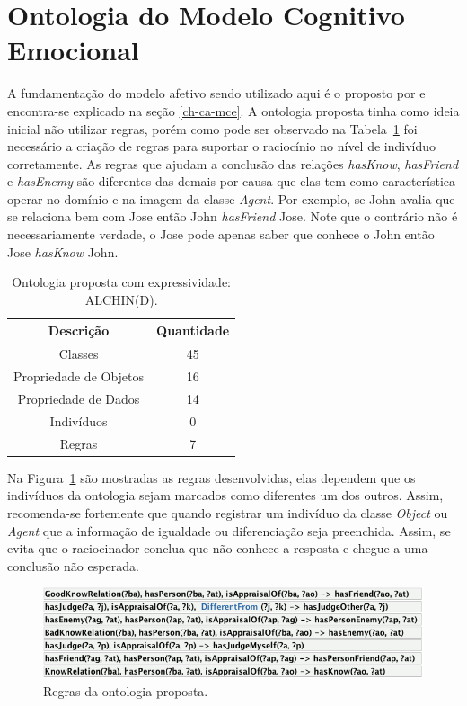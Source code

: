 \section{Ontologia do Modelo Cognitivo Emocional} \label{ch:aec:omce}

A fundamentação do modelo afetivo sendo utilizado aqui é o proposto por
\citet{ortony1988cse} e encontra-se explicado na seção \ref{ch-ca-mce}. A
ontologia proposta tinha como ideia inicial não utilizar regras, porém como
pode ser observado na Tabela~\ref{tab:oa:geral} foi necessário a criação de
regras para suportar o raciocínio no nível de indivíduo corretamente. As
regras que ajudam a conclusão das relações \emph{hasKnow}, \emph{hasFriend} e
\emph{hasEnemy} são diferentes das demais por causa que elas tem como
característica operar no domínio e na imagem da classe \emph{Agent}. Por
exemplo, se John avalia que se relaciona bem com Jose então John
\emph{hasFriend} Jose. Note que o contrário não é necessariamente verdade, o
Jose pode apenas saber que conhece o John então Jose \emph{hasKnow} John.

\begin{table}[h]
	\caption{Ontologia proposta com expressividade: ALCHIN(D).}
	\label{tab:oa:geral}
	\begin{center}
	\begin{tabular}{|c|c|}
		\hline
		Descrição & Quantidade \\ \hline
		Classes &  45 		\\ \hline
		Propriedade de Objetos & 16 \\ \hline
		Propriedade de Dados & 14 \\ \hline
		Indivíduos &  0		\\ \hline
		Regras & 7 \\ \hline
	\end{tabular}
	\end{center}
\end{table}

Na Figura~\ref{fig:rlocc} são mostradas as regras desenvolvidas, elas dependem
que os indivíduos da ontologia sejam marcados como diferentes um dos outros.
Assim, recomenda-se fortemente que quando registrar um indivíduo da classe
\emph{Object} ou \emph{Agent} que a informação de igualdade ou diferenciação
seja preenchida\dev{}. Assim, se evita que o raciocinador conclua que não
conhece a resposta e chegue a uma conclusão não esperada.

\begin{figure}[b]
  \centering
  \includegraphics[width=14cm]{figuras/rules-LOCC.png}
  \caption{Regras da ontologia proposta.}
  \label{fig:rlocc}
\end{figure}

